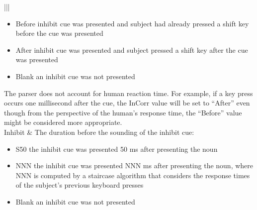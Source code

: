 \documentclass[letterpaper,10pt,english]{sphinxmanual}
\begin{document}
\begin{savenotes}
\begin{longtable}{|*{2}{|}}
\begin{itemize}
\item {} 
Before \textendash{} inhibit cue was presented and subject had already pressed a shift key before the cue was presented

\item {} 
After \textendash{} inhibit cue was presented and subject pressed a shift key after the cue was presented

\item {} 
Blank \textendash{} an inhibit cue was not presented

\end{itemize}

The parser does not account for human reaction time. For example, if a key press occurs one millisecond after the cue, the InCorr value will be set to “After” even though from the perspective of the human’s response time, the “Before” value might be considered more appropriate.
\\
\hline
Inhibit
&
The duration before the sounding of the inhibit cue:
\begin{itemize}
\item {} 
S50 \textendash{} the inhibit cue was presented 50 ms after presenting the noun

\item {} 
NNN \textendash{} the inhibit cue was presented NNN ms after presenting the noun, where NNN is computed by a staircase algorithm that considers the response times of the subject’s previous keyboard presses

\item {} 
Blank \textendash{} an inhibit cue was not presented


\end{itemize}
\end{longtable}
\end{savenotes}
\end{document}
